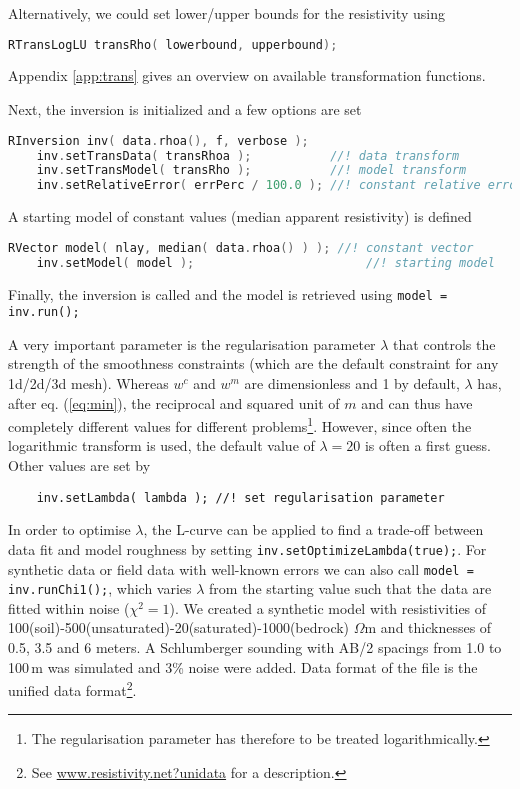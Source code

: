 Alternatively, we could set lower/upper bounds for the resistivity using
\begin{lstlisting}[language=C++]
    RTransLogLU transRho( lowerbound, upperbound);
\end{lstlisting}
Appendix \ref{app:trans} gives an overview on available transformation functions.

Next, the inversion is initialized and a few options are set
\begin{lstlisting}[language=C++]
    RInversion inv( data.rhoa(), f, verbose );
    inv.setTransData( transRhoa );           //! data transform
    inv.setTransModel( transRho );           //! model transform
    inv.setRelativeError( errPerc / 100.0 ); //! constant relative error
\end{lstlisting}

A starting model of constant values (median apparent resistivity) is defined
\begin{lstlisting}[language=C++]
    RVector model( nlay, median( data.rhoa() ) ); //! constant vector
    inv.setModel( model );                        //! starting model
\end{lstlisting}

Finally, the inversion is called and the model is retrieved using \lstinline|model = inv.run();|

A very important parameter is the regularisation parameter $\lambda$ that controls the strength of the smoothness constraints (which are the default constraint for any 1d/2d/3d mesh).
Whereas $w^c$ and $w^m$ are dimensionless and 1 by default, $\lambda$ has, after eq. (\ref{eq:min}), the reciprocal and squared unit of $m$ and can thus have completely different values for different problems\footnote{The regularisation parameter has therefore to be treated logarithmically.}.
However, since often the logarithmic transform is used, the default value of $\lambda=20$ is often a first guess.
Other values are set by
\begin{lstlisting}
    inv.setLambda( lambda ); //! set regularisation parameter
\end{lstlisting}

In order to optimise $\lambda$, the L-curve \citep{guentherruecker06,guentherdiss} can be applied to find a trade-off between data fit and model roughness by setting \lstinline|inv.setOptimizeLambda(true);|.
For synthetic data or field data with well-known errors we can also call \lstinline|model = inv.runChi1();|, which varies $\lambda$ from the starting value such that the data are fitted within noise ($\chi^2=1$).
We created a synthetic model with resistivities of 100(soil)-500(unsaturated)-20(saturated)-1000(bedrock) $\Omega$m and thicknesses of 0.5, 3.5 and 6 meters.
A Schlumberger sounding with AB/2 spacings from 1.0 to 100\,m was simulated and 3\% noise were added.
Data format of the file  is the unified data format\footnote{See \url{www.resistivity.net?unidata} for a description.}.

